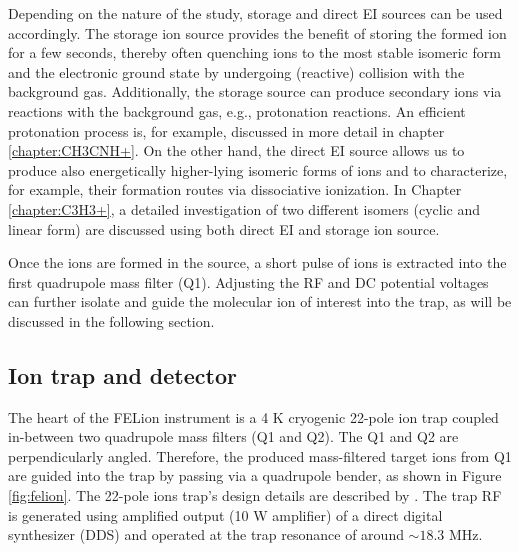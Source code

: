 Depending on the nature of the study, storage and direct EI sources can be used accordingly. The storage ion source provides the benefit of storing the formed ion for a few seconds, thereby often quenching ions to the most stable isomeric form  and the electronic ground state by undergoing (reactive) collision with the background gas. Additionally, the storage source can produce secondary ions via reactions with the background gas, e.g., protonation reactions. An efficient protonation process is, for example, discussed in more detail in chapter \ref{chapter:CH3CNH+}. On the other hand, the direct EI source allows us to produce also energetically higher-lying isomeric forms of ions and to characterize, for example, their formation routes via dissociative ionization. In Chapter \ref{chapter:C3H3+}, a detailed investigation of two different isomers (cyclic and linear form) are discussed using both direct EI and storage ion source.

Once the ions are formed in the source, a short pulse of ions is extracted into the first quadrupole mass filter (Q1). Adjusting the RF and DC potential voltages can further isolate and guide the molecular ion of interest into the trap, as will be discussed in the following section.

\subsection{Ion trap and detector}
\label{subsec:setup:ion-trap-and-detector}

The heart of the FELion instrument is a 4 K cryogenic 22-pole ion trap coupled in-between two quadrupole mass filters (Q1 and Q2). The Q1 and Q2 are perpendicularly angled. Therefore, the produced mass-filtered target ions from Q1 are guided into the trap by passing via a quadrupole bender, as shown in Figure \ref{fig:felion}. The 22-pole ions trap's design details are described by \citet{asvany_note_2010}. The trap RF is generated using amplified output (10 W amplifier) of a direct digital synthesizer (DDS) and operated at the trap resonance of around $\sim 18.3$ MHz. 

